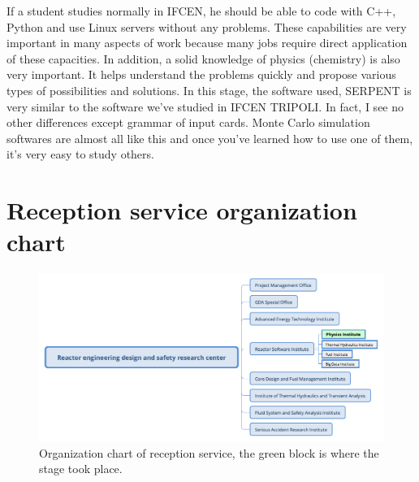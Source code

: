 If a student studies normally in IFCEN, he should be able to code with C++, Python and use Linux servers without any problems.
These capabilities are very important in many aspects of work because many jobs require direct application of these capacities.
In addition, a solid knowledge of physics (chemistry) is also very important.
It helps understand the problems quickly and propose various types of possibilities and solutions.
In this stage, the software used, SERPENT is very similar to the software we've studied in IFCEN TRIPOLI.
In fact, I see no other differences except grammar of input cards.
Monte Carlo simulation softwares are almost all like this and once you've learned how to use one of them, it's very easy to study others.



\newpage
\section{Reception service organization chart}
\label{sec:organization_chart}
\begin{figure}[!htb]
    \centering\includegraphics[width=1\linewidth]{Figs/Organigramme.png}
    \caption{Organization chart of reception service, the green block is where the stage took place.}
    \label{fig:organigramme}
\end{figure}